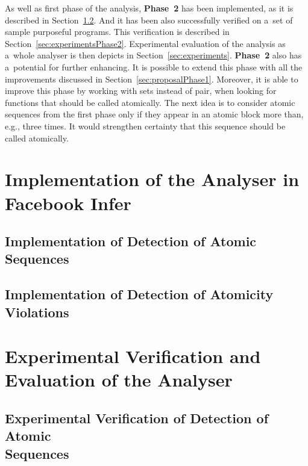 As well as first phase of the analysis, \textbf{Phase~2} has been implemented,
as it is described in Section~\ref{sec:implementationPhase2}. And it has been
also successfully verified on a~set of sample purposeful programs. This
verification is described in Section~\ref{sec:experimentsPhase2}.
Experimental evaluation of the analysis as a~whole analyser is then
depicts in Section~\ref{sec:experiments}. \textbf{Phase~2} also has 
a~potential for further enhancing. It is possible to extend this phase
with all the improvements discussed in Section~\ref{sec:proposalPhase1}.
Moreover, it is able to improve this phase by working with sets instead
of pair, when looking for functions that should be called atomically.
The next idea is to consider atomic sequences from the first phase only
if they appear in an atomic block more than, e.g., three times. It would
strengthen certainty that this sequence should be called atomically.



\chapter{Implementation of the Analyser in Facebook Infer}
\label{chap:implementation}



\section{Implementation of Detection of Atomic Sequences}
\label{sec:implementationPhase1}



\section{Implementation of Detection of Atomicity Violations}
\label{sec:implementationPhase2}




\chapter{Experimental Verification and Evaluation of the Analyser}
\label{chap:experiments}



\section[%
    Experimental Verification of Detection of Atomic Sequences%
]{Experimental Verification of Detection of Atomic \\ Sequences}
\label{sec:experimentsPhase1}

